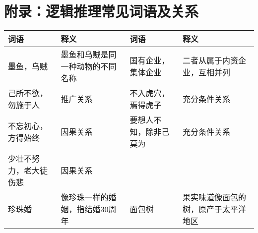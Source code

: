 \section{附录：逻辑推理常见词语及关系}
\label{trd:appendix}

\begin{longtable}{|p{}|p{}|p{}|p{}|}
    \hline
    \textbf{词语} & \textbf{释义}      & \textbf{词语} & \textbf{释义}        \\
    \hline
    墨鱼，乌贼       & 墨鱼和乌贼是同一种动物的不同名称 & 国有企业，集体企业   & 二者从属于内资企业，互相并列     \\
    \hline
    己所不欲，勿施于人   & 推广关系             & 不入虎穴，焉得虎子   & 充分条件关系             \\
    \hline
    不忘初心，方得始终   & 因果关系             & 要想人不知，除非己莫为 & 充分条件关系             \\
    \hline
    少壮不努力，老大徒伤悲 & 因果关系             &             &                    \\
    \hline
    珍珠婚         & 像珍珠一样的婚姻，指结婚30周年 & 面包树         & 果实味道像面包的树，原产于太平洋地区 \\
    \hline

\end{longtable}